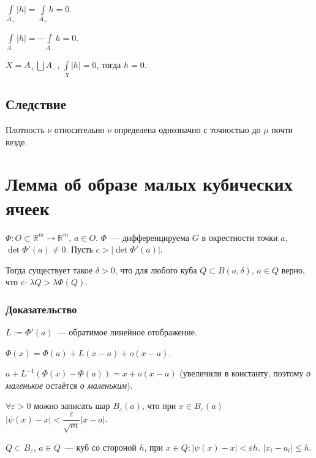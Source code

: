 \documentclass{article}
\begin{document}
            $\int\limits_{A_+} |h| = \int\limits_{A_+} h = 0$.
            
            $\int\limits_{A_-} |h| = - \int\limits_{A_-} h = 0$.
            
            $X = A_+ \bigsqcup A_-$, $\int\limits_{X} |h| = 0$, тогда $h = 0$.
            
        \subsection{Следствие}
        
            Плотность $\nu$ относительно $\nu$ определена однозначно с точностью до $\mu$ почти везде.
    
    \newpage
        
    \section{Лемма об образе малых кубических ячеек}
    
        $\Phi : O \subset \mathbb{R}^m \rightarrow \mathbb{R}^m$, $a \in O$. $\Phi$~--- дифференцируема $G$ в окрестности точки $a$, $\det \Phi'(a) \neq 0$. Пусть $c > | \det \Phi'(a) |$. 
        
        Тогда существует такое $\delta > 0$, что для любого куба $Q \subset B(a, \delta)$, $a \in Q$ верно, что $c \cdot \lambda Q > \lambda \Phi(Q)$.
        
        \subsubsection{Доказательство}
        
            $L := \Phi'(a)$~--- обратимое линейное отображение. 
            
            $\Phi(x) = \Phi(a) + L (x - a) + o(x - a)$.
            
            $a + L^{-1}(\Phi(x) - \Phi(a)) = x + o(x - a)$ (увеличили в константу, поэтому \textit{о маленькое} остаётся \textit{о маленьким}).
            
            $\forall \varepsilon > 0$ можно записать шар $B_{\varepsilon}(a)$, что при $x \in B_{\varepsilon}(a)$ $\left| \psi(x) - x \right| < \dfrac{\varepsilon}{\sqrt{m}} |x - a|$.
            
            $Q \subset B_{\varepsilon}$, $a \in Q$~--- куб со стороной $h$, при $x \in Q : | \psi(x) - x| < \varepsilon h$. $|x_i - a_i| \leqslant h$.
            
\end{document}
